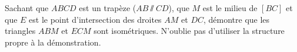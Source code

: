 %
%
    Sachant que $ABCD$ est un trapèze ($AB\sslash CD$), que $M$ est le milieu de $[BC]$ et que $E$ est le point d'intersection des droites $AM$ et $DC$, démontre que les triangles $ABM$ et $ECM$ sont isométriques. N'oublie pas d'utiliser la structure propre à la démonstration.
    \begin{center}
        
    \end{center}
